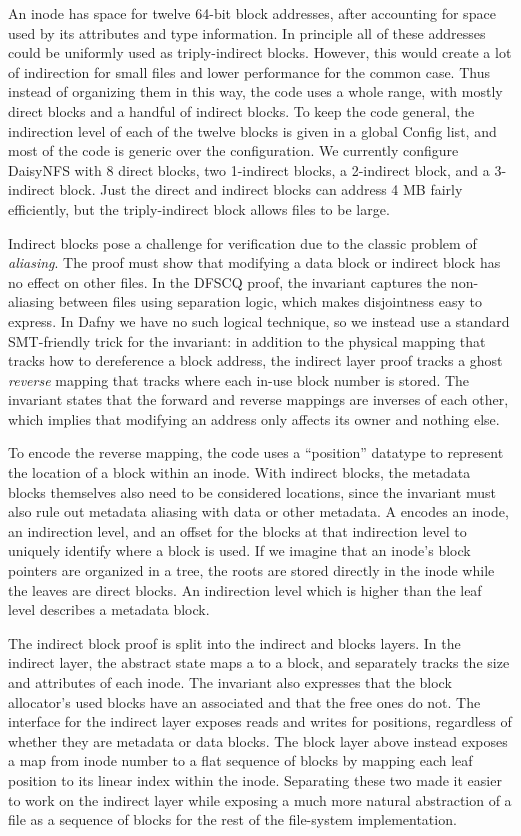 An inode has space for twelve 64-bit block addresses, after accounting for space
used by its attributes and type information. In principle all of these addresses
could be uniformly used as triply-indirect blocks. However, this would create a
lot of indirection for small files and lower performance for the common case.
Thus instead of organizing them in this way, the code uses a whole range, with
mostly direct blocks and a handful of indirect blocks. To keep the code general,
the indirection level of each of the twelve blocks is given in a global Config
list, and most of the code is generic over the configuration. We currently
configure DaisyNFS with 8 direct blocks, two 1-indirect blocks, a 2-indirect
block, and a 3-indirect block. Just the direct and indirect blocks can address 4
MB fairly efficiently, but the triply-indirect block allows files to be large.

Indirect blocks pose a challenge for verification due to the classic problem of
\emph{aliasing}. The proof must show that modifying a data block or indirect
block has no effect on other files. In the DFSCQ proof, the invariant
captures the non-aliasing between files using separation logic, which makes
disjointness easy to express. In Dafny we have no such logical
technique, so we instead use a standard SMT-friendly trick for the invariant: in
addition to the physical mapping that tracks how to dereference a block address,
the indirect layer proof tracks a ghost \emph{reverse} mapping that tracks where
each in-use block number is stored. The invariant states that the forward and reverse
mappings are inverses of each other, which implies that modifying an address
only affects its owner and nothing else.

To encode the reverse mapping, the code uses a ``position'' datatype  to
represent the location of a block within an inode. With indirect blocks, the
metadata blocks themselves also need to be considered locations, since the
invariant must also rule out metadata aliasing with data or other metadata. A
 encodes an inode, an indirection level, and an offset for the blocks at
that indirection level to uniquely identify where a block is used. If we imagine
that an inode's block pointers are organized in a tree, the roots are stored
directly in the inode while the leaves are direct blocks. An indirection level
which is higher than the leaf level describes a metadata block.

The indirect block proof is split into the indirect and blocks layers. In the
indirect layer, the abstract state maps a  to a block, and separately
tracks the size and attributes of each inode. The invariant also expresses that
the block allocator's used blocks have an associated  and that the free
ones do not. The interface for the indirect layer exposes reads and writes for
positions, regardless of whether they are metadata or data blocks. The block
layer above instead exposes a map from inode number to a flat sequence of blocks by
mapping each leaf position to its linear index within the inode. Separating
these two made it easier to work on the indirect layer while exposing a much
more natural abstraction of a file as a sequence of blocks for the rest of the
file-system implementation.

